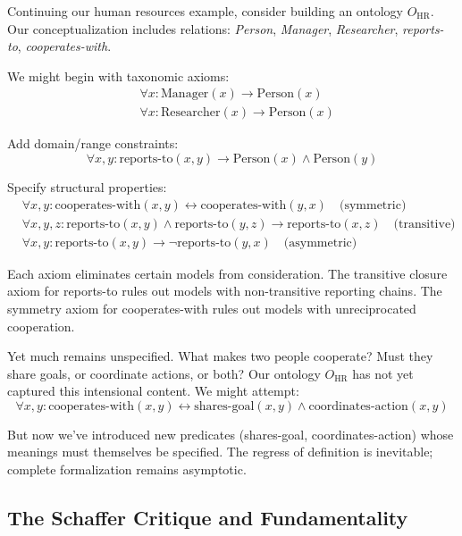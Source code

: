 \begin{example}
	Continuing our human resources example, consider building an ontology $O_{\text{HR}}$. Our conceptualization includes relations: \textit{Person}, \textit{Manager}, \textit{Researcher}, \textit{reports-to}, \textit{cooperates-with}.
	
	We might begin with taxonomic axioms:
	\begin{align*}
		&\forall x: \text{Manager}(x) \to \text{Person}(x) \\
		&\forall x: \text{Researcher}(x) \to \text{Person}(x)
	\end{align*}
	
	Add domain/range constraints:
	$$\forall x,y: \text{reports-to}(x,y) \to \text{Person}(x) \land \text{Person}(y)$$
	
	Specify structural properties:
	\begin{align*}
		&\forall x,y: \text{cooperates-with}(x,y) \leftrightarrow \text{cooperates-with}(y,x) \quad \text{(symmetric)} \\
		&\forall x,y,z: \text{reports-to}(x,y) \land \text{reports-to}(y,z) \to \text{reports-to}(x,z) \quad \text{(transitive)} \\
		&\forall x,y: \text{reports-to}(x,y) \to \neg\text{reports-to}(y,x) \quad \text{(asymmetric)}
	\end{align*}
	
	Each axiom eliminates certain models from consideration. The transitive closure axiom for reports-to rules out models with non-transitive reporting chains. The symmetry axiom for cooperates-with rules out models with unreciprocated cooperation.
	
	Yet much remains unspecified. What makes two people cooperate? Must they share goals, or coordinate actions, or both? Our ontology $O_{\text{HR}}$ has not yet captured this intensional content. We might attempt:
	$$\forall x,y: \text{cooperates-with}(x,y) \leftrightarrow \text{shares-goal}(x,y) \land \text{coordinates-action}(x,y)$$
	
	But now we've introduced new predicates (shares-goal, coordinates-action) whose meanings must themselves be specified. The regress of definition is inevitable; complete formalization remains asymptotic.
\end{example}

\subsection{The Schaffer Critique and Fundamentality}

